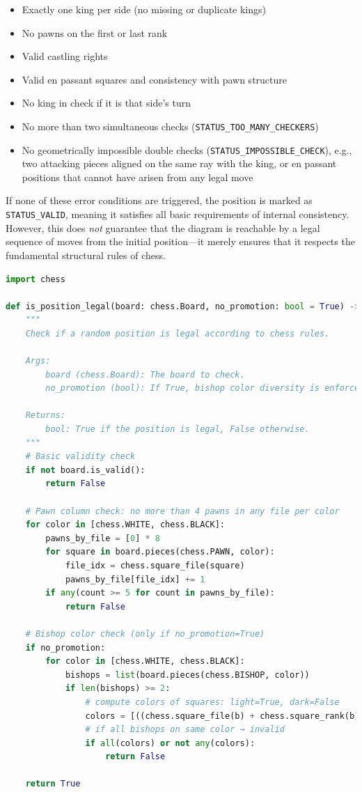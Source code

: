 \documentclass[12pt]{article}
\begin{document}
\begin{itemize}
    \item Exactly one king per side (no missing or duplicate kings)
    \item No pawns on the first or last rank
    \item Valid castling rights
    \item Valid en passant squares and consistency with pawn structure
    \item No king in check if it is that side’s turn
    \item No more than two simultaneous checks (\texttt{STATUS\_TOO\_MANY\_CHECKERS})
    \item No geometrically impossible double checks (\texttt{STATUS\_IMPOSSIBLE\_CHECK}), 
          e.g., two attacking pieces aligned on the same ray with the king,
          or en passant positions that cannot have arisen from any legal move
\end{itemize}

\noindent
If none of these error conditions are triggered, the position is marked as 
\texttt{STATUS\_VALID}, meaning it satisfies all basic requirements of internal consistency.
However, this does \emph{not} guarantee that the diagram is reachable by a legal sequence of moves from the initial position---it merely ensures that it respects the fundamental structural rules of chess.

\begin{lstlisting}[language=Python, caption={Validation of chess positions using python-chess}, label={lst:is_legal}]
import chess

def is_position_legal(board: chess.Board, no_promotion: bool = True) -> bool:
    """
    Check if a random position is legal according to chess rules.

    Args:
        board (chess.Board): The board to check.
        no_promotion (bool): If True, bishop color diversity is enforced for each side.

    Returns:
        bool: True if the position is legal, False otherwise.
    """
    # Basic validity check
    if not board.is_valid():
        return False

    # Pawn column check: no more than 4 pawns in any file per color
    for color in [chess.WHITE, chess.BLACK]:
        pawns_by_file = [0] * 8
        for square in board.pieces(chess.PAWN, color):
            file_idx = chess.square_file(square)
            pawns_by_file[file_idx] += 1
        if any(count >= 5 for count in pawns_by_file):
            return False

    # Bishop color check (only if no_promotion=True)
    if no_promotion:
        for color in [chess.WHITE, chess.BLACK]:
            bishops = list(board.pieces(chess.BISHOP, color))
            if len(bishops) >= 2:
                # compute colors of squares: light=True, dark=False
                colors = [((chess.square_file(b) + chess.square_rank(b)) % 2 == 0) for b in bishops]
                # if all bishops on same color → invalid
                if all(colors) or not any(colors):
                    return False

    return True
\end{lstlisting}
\end{document}
